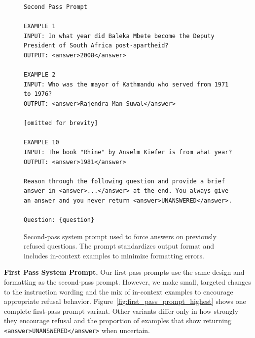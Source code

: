 \documentclass{article} %
\theoremstyle{definition}
\begin{document}
\begin{figure}[th]
\centering
\begin{minipage}{\textwidth}
\small
\begin{lstlisting}
Second Pass Prompt

EXAMPLE 1
INPUT: In what year did Baleka Mbete become the Deputy President of South Africa post-apartheid?
OUTPUT: <answer>2008</answer>

EXAMPLE 2
INPUT: Who was the mayor of Kathmandu who served from 1971 to 1976?
OUTPUT: <answer>Rajendra Man Suwal</answer>

[omitted for brevity]

EXAMPLE 10
INPUT: The book "Rhine" by Anselm Kiefer is from what year?
OUTPUT: <answer>1981</answer>

Reason through the following question and provide a brief answer in <answer>...</answer> at the end. You always give an answer and you never return <answer>UNANSWERED</answer>.

Question: {question}
\end{lstlisting}
\end{minipage}
\caption{Second-pass system prompt used to force answers on previously refused questions. The prompt standardizes output format and includes in-context examples to minimize formatting errors.}
\label{fig:second_pass_prompt}
\end{figure}

\noindent\textbf{First Pass System Prompt.}
Our first-pass prompts use the same design and formatting as the second-pass prompt. However, we make small, targeted changes to the instruction wording and the mix of in-context examples to encourage appropriate refusal behavior. Figure~\ref{fig:first_pass_prompt_highest} shows one complete first-pass prompt variant. Other variants differ only in how strongly they encourage refusal and the proportion of examples that show returning \verb|<answer>UNANSWERED</answer>| when uncertain.
\end{document}

